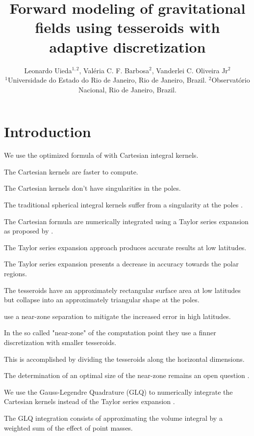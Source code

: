 \documentclass[extra,mreferee]{gji}
\title[Tesseroid forward modeling with adaptive discretization]{
Forward modeling of gravitational fields using tesseroids with adaptive
discretization
}
\author[Uieda et al.]{
Leonardo Uieda$^{1,2}$,
Val\'eria C. F. Barbosa$^{2}$,
Vanderlei C. Oliveira Jr$^{2}$
\\
$^1$Universidade do Estado do Rio de Janeiro, Rio de Janeiro, Brazil.
$^2$Observat\'orio Nacional, Rio de Janeiro, Brazil.
}
\begin{document}
\label{firstpage}
\maketitle

\begin{abstract}
\end{abstract}

\section{Introduction}


We use the optimized formula of \citet{Grombein2013} with Cartesian integral
kernels.

The Cartesian kernels are faster to compute.

The Cartesian kernels don't have singularities in the poles.

The traditional spherical integral kernels suffer from a singularity at the
poles \citep{Heck2007, Wild-Pfeiffer2008}.

The Cartesian formula are numerically integrated using a Taylor series
expansion as proposed by \citet{Heck2007}.

The Taylor series expansion approach produces accurate results at low
latitudes.

The Taylor series expansion presents a decrease in accuracy towards the polar
regions.

The tesseroids have an approximately rectangular surface area at low latitudes
but collapse into an approximately triangular shape at the poles.

\citet{Grombein2013} use a near-zone separation to mitigate the increased error
in high latitudes.

In the so called "near-zone" of the computation point they use a finner
discretization with smaller tesseroids.

This is accomplished by dividing the tesseroids along the horizontal
dimensions.

The determination of an optimal size of the near-zone remains an open question
\citep{Grombein2013}.

We use the Gauss-Legendre Quadrature (GLQ) to numerically integrate the Cartesian
kernels instead of the Taylor series expansion \citep{Asgharzadeh2007}.

The GLQ integration consists of approximating the volume integral by a weighted sum of
the effect of point masses.
\end{document}
